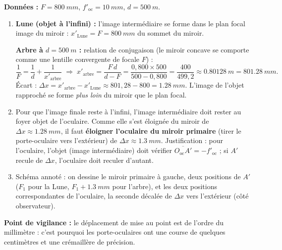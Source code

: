 \documentclass[11pt]{article}
\begin{document}
\begin{corrige}
\textbf{Données :} $F = \SI{800}{mm}$, $f'_{\text{oc}} = \SI{10}{mm}$, $d = \SI{500}{m}$.
\begin{enumerate}
    \item \textbf{Lune (objet à l'infini) :} l'image intermédiaire se forme dans le plan focal image du miroir : $x'_{\text{Lune}} = F = \SI{800}{mm}$ du sommet du miroir.

    \textbf{Arbre à $d = \SI{500}{m}$ :} relation de conjugaison (le miroir concave se comporte comme une lentille convergente de focale $F$) :
    \[ \frac{1}{F} = \frac{1}{d} + \frac{1}{x'_{\text{arbre}}} \;\Rightarrow\; x'_{\text{arbre}} = \frac{F\,d}{d - F} = \frac{0,800 \times 500}{500 - 0,800} = \frac{400}{499,2} \approx \SI{0,80128}{m} = \SI{801,28}{mm}. \]
    Écart : $\Delta x = x'_{\text{arbre}} - x'_{\text{Lune}} \approx 801,28 - 800 = \SI{1,28}{mm}$. L'image de l'objet rapproché se forme \emph{plus loin} du miroir que le plan focal.
    \item Pour que l'image finale reste à l'infini, l'image intermédiaire doit rester au foyer objet de l'oculaire. Comme elle s'est éloignée du miroir de $\Delta x \approx \SI{1,28}{mm}$, il faut \textbf{éloigner l'oculaire du miroir primaire} (tirer le porte-oculaire vers l'extérieur) de $\Delta x \approx \SI{1,3}{mm}$. Justification : pour l'oculaire, l'objet (image intermédiaire) doit vérifier $\overline{O_{\text{oc}}A'} = -f'_{\text{oc}}$ ; si $A'$ recule de $\Delta x$, l'oculaire doit reculer d'autant.
    \item Schéma annoté : on dessine le miroir primaire à gauche, deux positions de $A'$ ($F_1$ pour la Lune, $F_1 + \SI{1,3}{mm}$ pour l'arbre), et les deux positions correspondantes de l'oculaire, la seconde décalée de $\Delta x$ vers l'extérieur (côté observateur).
\end{enumerate}
\textbf{Point de vigilance :} le déplacement de mise au point est de l'ordre du millimètre : c'est pourquoi les porte-oculaires ont une course de quelques centimètres et une crémaillère de précision.
\end{corrige}
\end{document}
